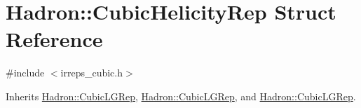 \hypertarget{structHadron_1_1CubicHelicityRep}{}\section{Hadron\+:\+:Cubic\+Helicity\+Rep Struct Reference}
\label{structHadron_1_1CubicHelicityRep}


{\ttfamily \#include $<$irreps\+\_\+cubic.\+h$>$}



Inherits \mbox{\hyperlink{structHadron_1_1CubicLGRep}{Hadron\+::\+Cubic\+L\+G\+Rep}}, \mbox{\hyperlink{structHadron_1_1CubicLGRep}{Hadron\+::\+Cubic\+L\+G\+Rep}}, and \mbox{\hyperlink{structHadron_1_1CubicLGRep}{Hadron\+::\+Cubic\+L\+G\+Rep}}.



